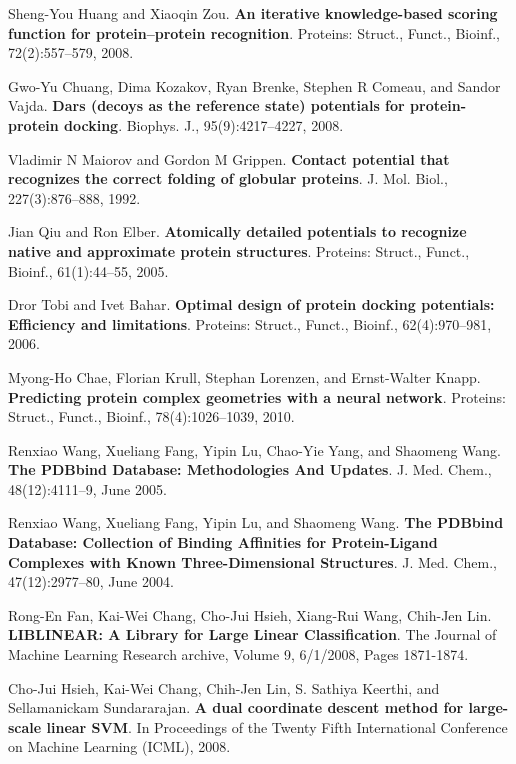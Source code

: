 \documentclass[preprint,12pt,3p]{elsarticle}
\begin{document}
\begin{thebibliography}{4}
Sheng-You Huang and Xiaoqin Zou.
\textbf{An iterative knowledge-based scoring function for protein–protein recognition}.
Proteins: Struct., Funct., Bioinf., 72(2):557–579, 2008.

Gwo-Yu Chuang, Dima Kozakov, Ryan Brenke, Stephen R Comeau, and Sandor Vajda.
\textbf{Dars (decoys as the reference state) potentials for protein-protein docking}.
Biophys. J., 95(9):4217–4227, 2008.

Vladimir N Maiorov and Gordon M Grippen.
\textbf{Contact potential that recognizes the correct folding of globular proteins}.
J. Mol. Biol., 227(3):876–888, 1992.

Jian Qiu and Ron Elber.
\textbf{Atomically detailed potentials to recognize native and approximate protein structures}.
Proteins: Struct., Funct., Bioinf., 61(1):44–55, 2005.

Dror Tobi and Ivet Bahar.
\textbf{Optimal design of protein docking potentials: Efficiency and limitations}.
Proteins: Struct., Funct., Bioinf., 62(4):970–981, 2006.

Myong-Ho Chae, Florian Krull, Stephan Lorenzen, and Ernst-Walter Knapp.
\textbf{Predicting protein complex geometries with a neural network}.
Proteins: Struct., Funct., Bioinf., 78(4):1026–1039, 2010.

Renxiao Wang, Xueliang Fang, Yipin Lu, Chao-Yie Yang, and Shaomeng Wang.
\textbf{The PDBbind Database: Methodologies And Updates}.
J. Med. Chem., 48(12):4111–9, June 2005.

Renxiao Wang, Xueliang Fang, Yipin Lu, and Shaomeng Wang.
\textbf{The PDBbind Database: Collection of Binding Affinities for Protein-Ligand Complexes with Known Three-Dimensional Structures}.
J. Med. Chem., 47(12):2977–80, June 2004.

Rong-En Fan, Kai-Wei Chang, Cho-Jui Hsieh, Xiang-Rui Wang, Chih-Jen Lin.
\textbf{LIBLINEAR: A Library for Large Linear Classification}.
The Journal of Machine Learning Research archive, Volume 9, 6/1/2008, Pages 1871-1874.

Cho-Jui Hsieh, Kai-Wei Chang, Chih-Jen Lin, S. Sathiya Keerthi, and Sellamanickam Sundararajan.
\textbf{ A dual coordinate descent method for large-scale linear SVM}.
In Proceedings
of the Twenty Fifth International Conference on Machine Learning (ICML), 2008.

\end{thebibliography}
\end{document}
